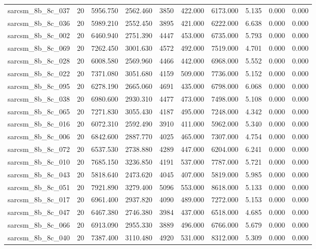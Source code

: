 \begin{tabular}{lrrrrrrrrr}
sarcsm\_8b\_8c\_037 & 20 & 5956.750 & 2562.460 & 3850 & 422.000 & 6173.000 & 5.135 & 0.000 & 0.000 \\
sarcsm\_8b\_8c\_036 & 20 & 5989.210 & 2552.450 & 3895 & 421.000 & 6222.000 & 6.638 & 0.000 & 0.000 \\
sarcsm\_8b\_8c\_002 & 20 & 6460.940 & 2751.390 & 4447 & 453.000 & 6735.000 & 5.793 & 0.000 & 0.000 \\
sarcsm\_8b\_8c\_069 & 20 & 7262.450 & 3001.630 & 4572 & 492.000 & 7519.000 & 4.701 & 0.000 & 0.000 \\
sarcsm\_8b\_8c\_028 & 20 & 6008.580 & 2569.960 & 4466 & 442.000 & 6968.000 & 5.552 & 0.000 & 0.000 \\
sarcsm\_8b\_8c\_022 & 20 & 7371.080 & 3051.680 & 4159 & 509.000 & 7736.000 & 5.152 & 0.000 & 0.000 \\
sarcsm\_8b\_8c\_095 & 20 & 6278.190 & 2665.060 & 4691 & 435.000 & 6798.000 & 6.068 & 0.000 & 0.000 \\
sarcsm\_8b\_8c\_038 & 20 & 6980.600 & 2930.310 & 4477 & 473.000 & 7498.000 & 5.108 & 0.000 & 0.000 \\
sarcsm\_8b\_8c\_065 & 20 & 7271.830 & 3055.430 & 4187 & 495.000 & 7248.000 & 4.342 & 0.000 & 0.000 \\
sarcsm\_8b\_8c\_016 & 20 & 6072.310 & 2592.490 & 3910 & 411.000 & 5962.000 & 5.340 & 0.000 & 0.000 \\
sarcsm\_8b\_8c\_006 & 20 & 6842.600 & 2887.770 & 4025 & 465.000 & 7307.000 & 4.754 & 0.000 & 0.000 \\
sarcsm\_8b\_8c\_072 & 20 & 6537.530 & 2738.880 & 4289 & 447.000 & 6204.000 & 6.241 & 0.000 & 0.000 \\
sarcsm\_8b\_8c\_010 & 20 & 7685.150 & 3236.850 & 4191 & 537.000 & 7787.000 & 5.721 & 0.000 & 0.000 \\
sarcsm\_8b\_8c\_043 & 20 & 5818.640 & 2473.620 & 4045 & 407.000 & 5819.000 & 5.985 & 0.000 & 0.000 \\
sarcsm\_8b\_8c\_051 & 20 & 7921.890 & 3279.400 & 5096 & 553.000 & 8618.000 & 5.133 & 0.000 & 0.000 \\
sarcsm\_8b\_8c\_017 & 20 & 6961.400 & 2937.820 & 4090 & 489.000 & 7272.000 & 5.153 & 0.000 & 0.000 \\
sarcsm\_8b\_8c\_047 & 20 & 6467.380 & 2746.380 & 3984 & 437.000 & 6518.000 & 4.685 & 0.000 & 0.000 \\
sarcsm\_8b\_8c\_066 & 20 & 6913.090 & 2955.330 & 3889 & 496.000 & 6766.000 & 5.679 & 0.000 & 0.000 \\
sarcsm\_8b\_8c\_040 & 20 & 7387.400 & 3110.480 & 4920 & 531.000 & 8312.000 & 5.309 & 0.000 & 0.000 \\

\end{tabular}
